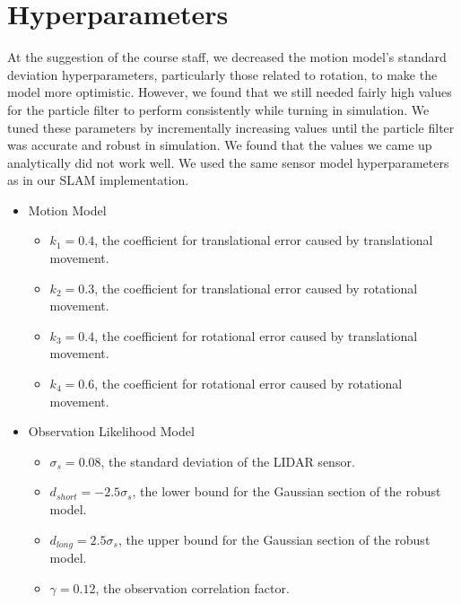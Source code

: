 \documentclass[11pt]{article}
\begin{document}
\section{Hyperparameters}

At the suggestion of the course staff, we decreased the motion model's standard
deviation hyperparameters, particularly those related to rotation, to make the
model more optimistic. However, we found that we still needed fairly high values
for the particle filter to perform consistently while turning in simulation. We
tuned these parameters by incrementally increasing values until the particle
filter was accurate and robust in simulation. We found that the values we came
up analytically did not work well. We used the same sensor model hyperparameters
as in our SLAM implementation.

\begin{itemize}
    \setlength\itemsep{0pt}
    \item Motion Model
    \begin{itemize}
        \setlength\itemsep{0pt}
        \item $k_1 = 0.4$, the coefficient for translational error caused by translational movement.
        \item $k_2 = 0.3$, the coefficient for translational error caused by rotational movement.
        \item $k_3 = 0.4$, the coefficient for rotational error caused by translational movement.
        \item $k_4 = 0.6$, the coefficient for rotational error caused by rotational movement.
    \end{itemize}

    \item Observation Likelihood Model
    \begin{itemize}
        \setlength\itemsep{0pt}
        \item $\sigma_s = 0.08$, the standard deviation of the LIDAR sensor.
        \item $d_{short} = -2.5 \sigma_s$, the lower bound for the Gaussian section of the robust model.
        \item $d_{long} = 2.5 \sigma_s$, the upper bound for the Gaussian section of the robust model.
        \item $\gamma = 0.12$, the observation correlation factor.
    \end{itemize}
\end{itemize}
\end{document}
